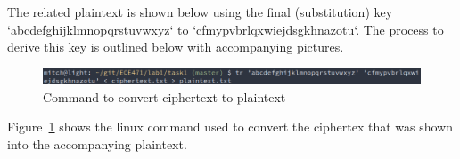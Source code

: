 \documentclass[12pt]{article}
\begin{document}
The related plaintext is shown below using the final (substitution) key `abcdefghijklmnopqrstuvwxyz` to
`cfmypvbrlqxwiejdsgkhnazotu`. The process to derive this key is outlined below with accompanying pictures.

\begin{figure}[H]
    \begin{center}
        \includegraphics[scale=0.5]{c23.png}
    \end{center}{}
    \caption{Command to convert ciphertext to plaintext}
    \label{fig:c23}
\end{figure}

Figure~\ref{fig:c23} shows the linux command used to convert the ciphertex that was shown into the accompanying
plaintext.
\end{document}

